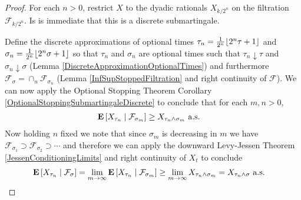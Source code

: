 \begin{proof}
For each $n>0$, restrict $X$ to the dyadic rationals $X_{k/2^n}$ on the
filtration $\mathcal{F}_{k/2^n}$.  Is is immediate that this is a
discrete submartingale.

Define the discrete approximations of optional times $\tau_n =
\frac{1}{2^n} \floor{2^n \tau + 1}$ and $\sigma_n = \frac{1}{2^n}
\floor{2^n \sigma + 1}$ so that $\tau_n$ and $\sigma_n$ are optional
times such that $\tau_n \downarrow \tau$ and $\sigma_n \downarrow
\sigma$ (Lemma \ref{DiscreteApproximationOptionalTimes}) and
furthermore $\mathcal{F}_\sigma = \cap_n \mathcal{F}_{\sigma_n}$ (Lemma
\ref{InfSupStoppedFiltration} and right
continuity of $\mathcal{F}$).
We can now apply the Optional Stopping Theorem Corollary
\ref{OptionalStoppingSubmartingaleDiscrete} to conclude that for each
$m,n>0$,
\begin{align*}
\cexpectationlong{\mathcal{F}_{\sigma_m}}{X_{\tau_n}} &\geq X_{\tau_n \wedge
  \sigma_m} \text{ a.s.}
\end{align*}
Now holding $n$ fixed we note that since $\sigma_m$ is decreasing in
$m$ we have $\mathcal{F}_{\sigma_1} \supset
\mathcal{F}_{\sigma_{2}} \supset \cdots$ and therefore we can apply
the downward Levy-Jessen Theorem \ref {JessenConditioningLimits} and
right continuity of $X_t$ to
conclude 
\begin{align*}
\cexpectationlong{\mathcal{F}_{\sigma}}{X_{\tau_n}} &=\lim_{m \to
  \infty} \cexpectationlong{\mathcal{F}_{\sigma_m}}{X_{\tau_n}}  \geq
\lim_{m \to \infty} X_{\tau_n \wedge  \sigma_m} 
= X_{\tau_n \wedge \sigma} \text{ a.s.}
\end{align*}


\end{proof}
